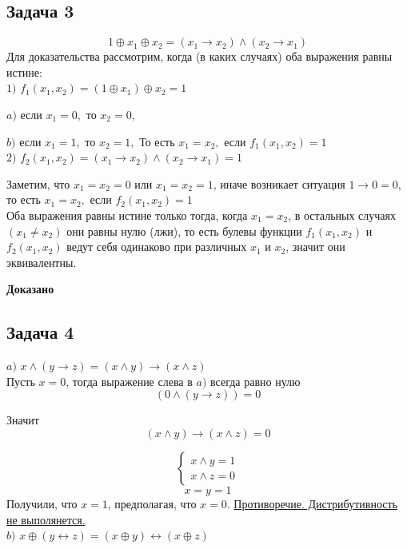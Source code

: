 \documentclass[a4paper,12pt]{article} %
\begin{document}
\newpage
\begin{center}
\section*{Задача 3}
\end{center}
\[1\oplus x_1 \oplus x_2 = (x_1\rightarrow x_2) \wedge (x_2\rightarrow x_1) \]
Для доказательства рассмотрим, когда (в каких случаях) оба выражения равны истине:\\

$1)$ $f_1(x_1, x_2)= (1\oplus x_1) \oplus x_2 =1$

$ a)$ если $x_1=0,$ то $x_2=0,$

$ b)$ если $x_1=1,$ то $x_2=1,$
То есть $x_1 = x_2,$ если $f_1(x_1, x_2)=1$ \\

$2)$ $f_2(x_1, x_2)= (x_1\rightarrow x_2) \wedge (x_2\rightarrow x_1)=1$

Заметим, что $x_1 = x_2 =0$ или $x_1 = x_2 =1$, иначе возникает ситуация $1\rightarrow 0 = 0$, то есть $x_1 = x_2,$ если $f_2(x_1, x_2)=1$ \\

Оба выражения равны истине только тогда, когда $x_1 = x_2$, в остальных случаях $(x_1 \neq x_2)$ они равны нулю (лжи), то есть булевы функции $f_1(x_1, x_2)$ и $f_2(x_1, x_2)$ ведут себя одинаково при различных $x_1$ и $x_2$, значит они эквивалентны.


\begin{flushright}
\begin{large}
\textbf {Доказано}
\end{large}
\end{flushright}

\begin{center}
\section*{Задача 4}
\end{center}


$a)$ $x\wedge (y\rightarrow z) =(x\wedge y)\rightarrow(x\wedge z)$\\

Пусть $x=0$, тогда выражение слева в $a)$ всегда равно нулю \[(0\wedge (y\rightarrow z))=0\]

Значит \[(x\wedge y)\rightarrow(x\wedge z)=0\]

\[\begin{cases}
  x\wedge y = 1\\
  x\wedge z = 0
\end{cases}\]
\[x=y=1\]
Получили, что $x=1$, предполагая, что $x=0$.
 \underline{Противоречие. Дистрибутивность не выполянется.}\\
 $b)$ $x\oplus (y \leftrightarrow z) = (x\oplus y)\leftrightarrow (x\oplus z)$ \\
\end{document}
